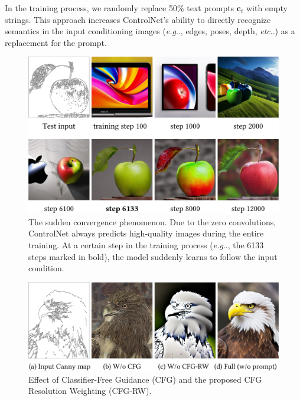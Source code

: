 \documentclass[10pt,twocolumn,letterpaper]{article}
\makeatletter
\DeclareRobustCommand\onedot{\futurelet\@let@token\@onedot}
\def\@onedot{\ifx\@let@token.\else.\null\fi\xspace}
\def\eg{\emph{e.g}\onedot}
\def\etc{\emph{etc}\onedot}
\makeatother
\begin{document}
	In the training process, we randomly replace 50\% text prompts
	$\bm{c}_t$ with empty strings. 
	This approach increases ControlNet's
	ability to directly recognize semantics in the input conditioning images
	(\eg, edges, poses, depth, \etc) as a replacement for the prompt.
	
	\begin{figure}[!t]
		\includegraphics[width=\linewidth]{./imgs/train.pdf}
		\vspace{-17pt}
		\caption{The sudden convergence phenomenon. 
			Due to the zero convolutions, ControlNet
			always predicts high-quality images during the
			entire training.  At a certain step in the
			training process (\eg, the 6133 steps marked
			in bold), the model suddenly learns to follow
			the input condition.}
		\vspace{-7pt}
		\label{fig:train}
	\end{figure}
	
	\begin{figure}[!t]
		\includegraphics[width=\linewidth]{./imgs/cfg.pdf}
		\vspace{-17pt}
		\caption{Effect of Classifier-Free Guidance (CFG) and the proposed CFG Resolution Weighting (CFG-RW).}
		\vspace{-7pt}
		\label{fig:cfg}
	\end{figure}
	
\end{document}
